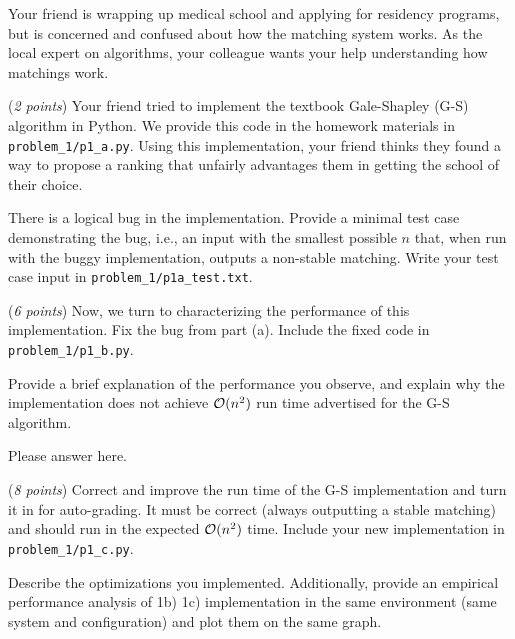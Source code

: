 \documentclass{hw_template}
\begin{document}

\begin{problem}
Your friend is wrapping up medical school
and applying for residency programs, but is concerned and confused about how the matching
system works. As the local expert on algorithms, your colleague wants your 
help understanding how matchings work. 


\begin{subproblem}
  (\textit{2 points})
  Your friend tried to implement the textbook Gale-Shapley (G-S)
  algorithm in Python. We provide this code in the homework materials in \texttt{problem\_1/p1\_a.py}. 
  Using this implementation, your friend thinks they found a way to propose a
  ranking that unfairly advantages them in getting the school of their choice.

  There is a logical bug in the implementation. Provide a minimal test case
  demonstrating the bug, i.e., an input with the smallest possible $n$ 
  that, when run with the buggy implementation, outputs a non-stable matching. Write your test case input in \texttt{problem\_1/p1a\_test.txt}.  
  
\end{subproblem}

\begin{subproblem}
  (\textit{6 points})
  Now, we turn to characterizing the performance of
  this implementation. Fix the bug from part (a). Include the fixed code in \texttt{problem\_1/p1\_b.py}.

  Provide a brief explanation of the performance you observe, and explain why the implementation does not achieve $\mathcal{O}(n^2)$ run time advertised for the G-S algorithm.
\end{subproblem}

\begin{solution}
Please answer here.
\end{solution}

\begin{subproblem}
\newcommand{\worstrank}{{\tt wr}}
  (\textit{8 points})
    Correct and improve the run time of the G-S implementation and turn it in for auto-grading. It must be correct (always outputting a stable matching) and should run in the expected $\mathcal{O}(n^2)$ time. Include your new implementation in \texttt{problem\_1/p1\_c.py}. 
    
    Describe the optimizations you implemented. Additionally, provide an empirical performance analysis of 1b) 1c) implementation in the same environment (same system and configuration) and plot them on the same graph. 
\end{subproblem}


\end{problem}
\end{document}
